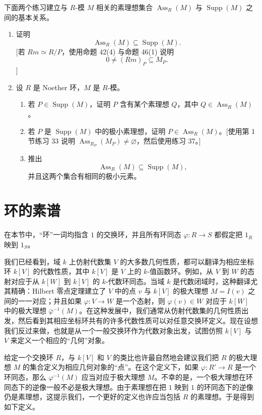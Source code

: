 下面两个练习建立与 $R$-模 $M$ 相关的素理想集合 $\operatorname{Ass}_R(M)$ 与 $\operatorname{Supp}(M)$ 之间的基本关系。
\begin{enumerate}[label=\arabic*.,start=39]
	\item 证明
	\[
	\operatorname{Ass}_R(M)\subseteq\operatorname{Supp}(M).
	\]
	[若 $Rm\simeq R/P$，使用命题 42(4) 与命题 46(1) 说明
	\[
	0\ne (Rm)_P\subseteq M_P.
	\]]
	
	\item 设 $R$ 是 Noether 环，$M$ 是 $R$-模。
	\begin{enumerate}[label=(\alph*)]
		\item 若 $P\in\operatorname{Supp}(M)$，证明 $P$ 含有某个素理想 $Q$，其中 $Q\in\operatorname{Ass}_R(M)$。
		\item 若 $P$ 是 $\operatorname{Supp}(M)$ 中的极小素理想，证明 $P\in\operatorname{Ass}_R(M)$。[使用第 1 节练习 33 说明 $\operatorname{Ass}_{R_P}(M_P)\ne\varnothing$，然后使用练习 37。]
		\item 推出
		\[
		\operatorname{Ass}_R(M)\subseteq\operatorname{Supp}(M),
		\]
		并且这两个集合有相同的极小元素。
	\end{enumerate}
\end{enumerate}

\section{环的素谱}

在本节中，“环”一词均指含 $1$ 的交换环，并且所有环同态 $\varphi:R\to S$ 都假定把 $1_R$ 映到 $1_S$。

我们已经看到，域 $k$ 上仿射代数集 $V$ 的大多数几何性质，都可以翻译为相应坐标环 $k[V]$ 的代数性质，其中 $k[V]$ 是 $V$ 上的 $k$-值函数环。例如，从 $V$ 到 $W$ 的态射对应于从 $k[W]$ 到 $k[V]$ 的 $k$-代数环同态。当域 $k$ 是代数闭域时，这种翻译尤其精确：Hilbert 零点定理建立了 $V$ 中的点 $v$ 与 $k[V]$ 的极大理想 $M=I(v)$ 之间的一一对应；并且如果 $\varphi:V\to W$ 是一个态射，则 $\varphi(v)\in W$ 对应于 $k[W]$ 中的极大理想 $\bar\varphi^{-1}(M)$。在这种发展中，我们通常从仿射代数集的几何性质出发，然后看到其相应坐标环共有的许多代数性质可以对任意交换环定义。现在设想我们反过来做，也就是从一个一般交换环作为代数对象出发，试图仿照 $k[V]$ 与 $V$ 来定义一个相应的“几何”对象。

给定一个交换环 $R$，与 $k[V]$ 和 $V$ 的类比也许最自然地会建议我们把 $R$ 的极大理想 $M$ 的集合定义为相应几何对象的“点”。在这个定义下，如果 $\varphi:R'\to R$ 是一个环同态，那么 $\varphi^{-1}(M)$ 应当对应于极大理想 $M$。不幸的是，一个极大理想在环同态下的逆像一般不必是极大理想。由于素理想在把 $1$ 映到 $1$ 的环同态下的逆像仍是素理想，这提示我们，一个更好的定义也许应当包括 $R$ 的素理想。于是得到如下定义。

